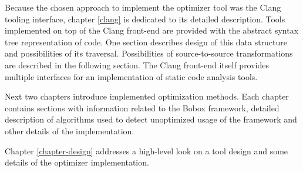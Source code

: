 Because the chosen approach to implement the optimizer tool was the Clang tooling interface, chapter \ref{clang} is dedicated to its detailed description. Tools implemented on top of the Clang front-end are provided with the abstract syntax tree representation of code. One section describes design of this data structure and possibilities of its traversal. Possibilities of source-to-source transformations are described in the following section. The Clang front-end itself provides multiple interfaces for an implementation of static code analysis tools.

Next two chapters introduce implemented optimization methods. Each chapter contains sections with information related to the Bobox framework, detailed description of algorithms used to detect unoptimized usage of the framework and other details of the implementation.

Chapter \ref{chapter-design} addresses a high-level look on a tool design and some details of the optimizer implementation.